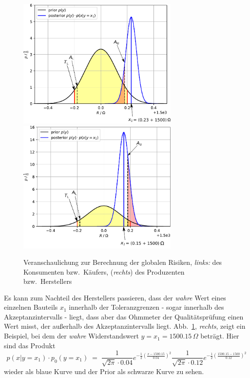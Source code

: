 \begin{figure}
\begin{center}
\includegraphics[width=80mm]{05_vorlesung/media/Konsumentenrisiko_x0p03.pdf}
\includegraphics[width=80mm]{05_vorlesung/media/Produzentenrisiko_x0p03.pdf}
\caption{Veranschaulichung zur Berechnung der globalen Risiken, \textsl{links:}
des Konsumenten bzw.\ Käufers, (\textsl{rechts}) des Produzenten bzw.\
Herstellers}
\label{risikoQS}
\end{center}
\end{figure}

Es kann zum Nachteil des Herstellers passieren, dass der \textsl{wahre} Wert
eines einzelnen Bauteils $x_1$ innerhalb der
Toleranzgrenzen - sogar innerhalb des Akzeptanzintervalls - liegt,
dass aber das Ohmmeter der Qualitätsprüfung einen Wert misst, der
außerhalb des Akzeptanzintervalls liegt. Abb.~\ref{risikoQS}, \textsl{rechts}, zeigt ein Beispiel, bei dem der \textsl{wahre} Widerstandswert $y = x_1 = 1500.15 \, \Omega$ beträgt.
Hier sind das Produkt
\begin{equation*}
p(x | y=x_1) \cdot p_0(y=x_1) \; = \;
 \frac{1}{\sqrt{2 \pi} \cdot 0.04}
	e^{-\frac{1}{2}\left(\frac{x - 1500.15}{0.04}\right)^2}
  \frac{1}{\sqrt{2 \pi} \cdot 0.12}
   e^{-\frac{1}{2}\left(\frac{1500.15 - 1500}{0.12}\right)^2}
\end{equation*}
wieder als blaue Kurve und der Prior als schwarze Kurve zu sehen.

